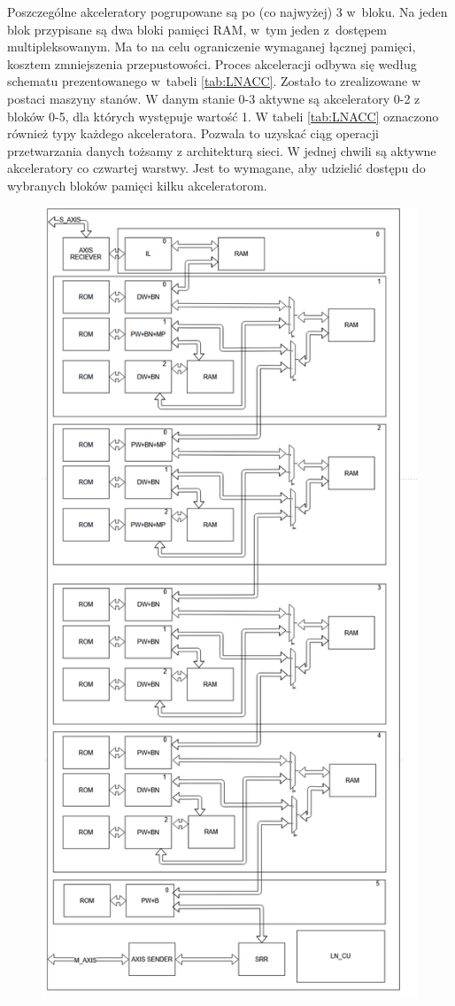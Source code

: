 Poszczególne akceleratory pogrupowane są po (co najwyżej) 3 w~bloku. 
Na jeden blok przypisane są dwa bloki pamięci RAM, w~tym jeden z~dostępem  multipleksowanym.
Ma to na celu ograniczenie wymaganej łącznej pamięci, kosztem zmniejszenia przepustowości. 
Proces akceleracji odbywa się według schematu prezentowanego w~tabeli \ref{tab:LNACC}.
Zostało to zrealizowane w postaci maszyny stanów.
W danym stanie 0-3 aktywne są akceleratory 0-2 z bloków 0-5, dla których występuje wartość 1.
W tabeli \ref{tab:LNACC} oznaczono również typy każdego akceleratora.
Pozwala to uzyskać ciąg operacji przetwarzania danych tożsamy z architekturą sieci. 
W jednej chwili są aktywne akceleratory co czwartej warstwy.
Jest to wymagane, aby udzielić dostępu do wybranych bloków pamięci kilku akceleratorom.

\begin{figure}
    \centering
    \includegraphics[height=0.9\textheight]{images/LNACC.png}

\end{figure}

